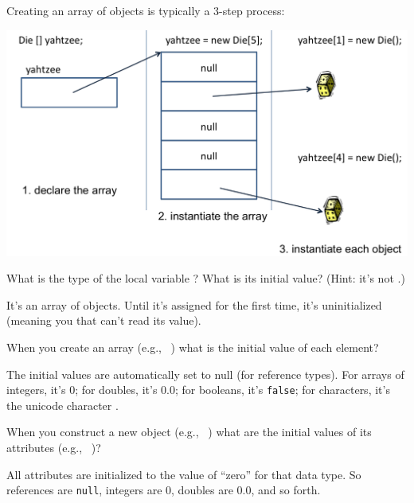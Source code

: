 
Creating an array of objects is typically a 3-step process:

\begin{center}
\includegraphics[width=5.5in]{yahtzee-array.png}
\end{center}




\Q What is the type of the local variable ?
What is its initial value? (Hint: it's not .)

\begin{answer}
It's an array of  objects. Until it's assigned for the first time, it's uninitialized (meaning you that can't read its value).
\end{answer}


\Q When you create an array (e.g., ~) what is the initial value of each element?

\begin{answer}
The initial values are automatically set to null (for reference types). For arrays of integers, it's 0; for doubles, it's 0.0; for booleans, it's {\tt false}; for characters, it's the unicode character .
\end{answer}


\Q When you construct a new object (e.g., ~) what are the initial values of its attributes (e.g., ~)?

\begin{answer}
All attributes are initialized to the value of ``zero'' for that data type.
So references are {\tt null}, integers are 0, doubles are 0.0, and so forth.
\end{answer}


